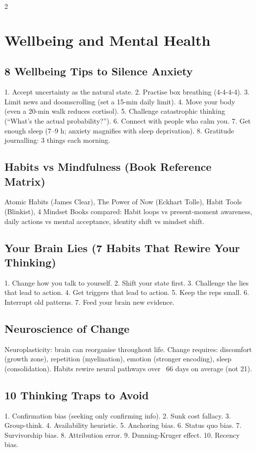 \documentclass[10pt,a4paper]{article}
\begin{document}
\begin{multicols}{2}
\section{Wellbeing and Mental Health}

\subsection{8 Wellbeing Tips to Silence Anxiety}
1. Accept uncertainty as the natural state.
2. Practise box breathing (4-4-4-4).
3. Limit news and doomscrolling (set a 15-min daily limit).
4. Move your body (even a 20-min walk reduces cortisol).
5. Challenge catastrophic thinking (``What's the actual probability?'').
6. Connect with people who calm you.
7. Get enough sleep (7--9 h; anxiety magnifies with sleep deprivation).
8. Gratitude journalling: 3 things each morning.

\subsection{Habits vs Mindfulness (Book Reference Matrix)}
Atomic Habits (James Clear), The Power of Now (Eckhart Tolle), Habit Tools (Blinkist), 4 Mindset Books compared: Habit loops vs present-moment awareness, daily actions vs mental acceptance, identity shift vs mindset shift.

\subsection{Your Brain Lies (7 Habits That Rewire Your Thinking)}
1. Change how you talk to yourself.
2. Shift your state first.
3. Challenge the lies that lead to action.
4. Get triggers that lead to action.
5. Keep the reps small.
6. Interrupt old patterns.
7. Feed your brain new evidence.

\subsection{Neuroscience of Change}
Neuroplasticity: brain can reorganise throughout life. Change requires: discomfort (growth zone), repetition (myelination), emotion (stronger encoding), sleep (consolidation). Habits rewire neural pathways over ~66 days on average (not 21).

\subsection{10 Thinking Traps to Avoid}
1. Confirmation bias (seeking only confirming info). 2. Sunk cost fallacy. 3. Group-think. 4. Availability heuristic. 5. Anchoring bias. 6. Status quo bias. 7. Survivorship bias. 8. Attribution error. 9. Dunning-Kruger effect. 10. Recency bias.


\end{multicols}
\end{document}
